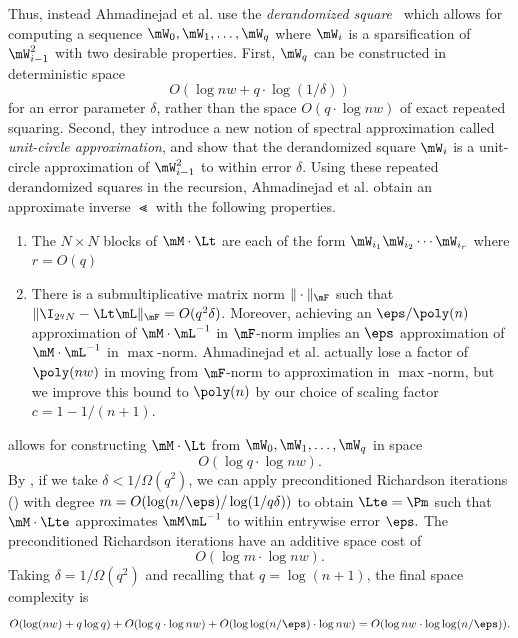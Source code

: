 \documentclass{toc}
\begin{document}
    Thus, instead %
Ahmadinejad  %
et al. use the \emph{derandomized square}~\cite{RozenmanVa05} which allows for computing a sequence
    $\mW_0,\mW_1,\ldots,\mW_q$ where $\mW_i$ is a sparsification of $\mW^2_{i-1}$ with two desirable properties. First, $\mW_q$ can be constructed in
    deterministic space $$O(\log nw+q\cdot \log(1/\delta))$$ for an error parameter $\delta$, rather than the space $O(q\cdot \log nw)$ of exact repeated squaring.  Second, they introduce a new notion of spectral approximation called \emph{unit-circle approximation}, and show that
    the derandomized square
    $\mW_i$ is a unit-circle approximation of $\mW_{i-1}^2$ to within 
    error $\delta$.
    Using these repeated derandomized squares in the recursion, 
%
Ahmadinejad  %
et al. obtain an approximate inverse $\Lt$ with the
%
following properties.  %
    \begin{enumerate}
        \item The $N\times N$ blocks of $\mM\cdot \Lt$ are 
        each of the form $\mW_{i_1}\mW_{i_2}\cdots \mW_{i_r}$
        where $r=O(q)$ \label{itm:degree}
        \item There is a submultiplicative matrix norm $\|\cdot \|_\mF$ such that
        $\|\I_{2^qN}-\Lt \mL\|_\mF = O(q^2\delta)$. Moreover, achieving an $\eps/\poly(n)$ approximation of $\mM\cdot \mL^{-1}$ in $\mF$-norm implies an $\eps$ approximation of $\mM\cdot \mL^{-1}$ in $\max$-norm.   %
Ahmadinejad  %
et al. actually lose a factor of $\poly(nw)$ in moving from $\mF$-norm to approximation in $\max$-norm, but we improve this bound to $\poly(n)$ by our choice of scaling factor $c=1-1/(n+1)$.   
        \label{itm:Fnorm} 
    \end{enumerate}

    
     allows for constructing $\mM\cdot \Lt$ from
    $\mW_0,\mW_1,\ldots,\mW_q$
    in space
    $$O(\log q \cdot \log nw).$$
    By , if we take $\delta<1/\Omega(q^2)$, we 
    can apply 
    preconditioned Richardson iterations ()
    with degree $m=O(\log(n/\eps)/\log(1/q\delta))$ to obtain $\Lte=\Pm$ 
    such that $\mM\cdot \Lte$ approximates $\mM\mL^{-1}$ to within entrywise error $\eps.$
    The preconditioned Richardson iterations have an additive
    space cost of %
    $$O(\log m\cdot \log nw).$$
    Taking $\delta=1/\Omega(q^2)$ and recalling that $q=\log(n+1)$, the final space complexity is
    $$O(\log(nw)+q\log q) + O(\log q\cdot \log nw)+O(\log\log (n/\eps)\cdot \log nw) = O(\log nw \cdot \log\log(n/\eps)).$$
    
\end{document}
